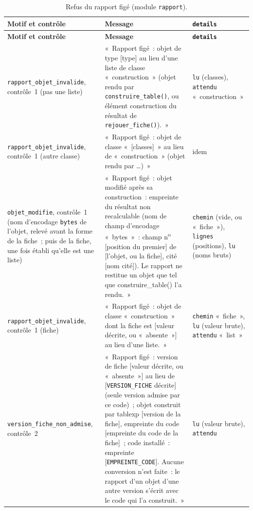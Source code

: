 \documentclass[a4paper,11pt]{article}
\newcommand{\code}[1]{\texttt{\small #1}}
\begin{document}
{\footnotesize
{}
\begin{longtable}{@{}p{4.7cm}p{7.3cm}p{2.6cm}@{}}
\caption{Refus du rapport figé (module \code{rapport}).}
\label{tab:refus-rapport}\\
\rowcolor{tableheader}
\textcolor{financeblue}{\textbf{Motif et contrôle}} &
\textcolor{financeblue}{\textbf{Message}} &
\textcolor{financeblue}{\textbf{\code{details}}} \\
\endfirsthead
\rowcolor{tableheader}
\textcolor{financeblue}{\textbf{Motif et contrôle}} &
\textcolor{financeblue}{\textbf{Message}} &
\textcolor{financeblue}{\textbf{\code{details}}} \\
\endhead
\code{rapport\_objet\_invalide}, contrôle~1 (pas une liste) & «~Rapport figé~: objet de type [type] au lieu d'une liste de classe «~construction~» (objet rendu par \code{construire\_table()}, ou élément construction du résultat de \code{rejouer\_fiche()}).~» & \code{lu} (classes), \code{attendu} «~construction~» \\
\code{rapport\_objet\_invalide}, contrôle~1 (autre classe) & «~Rapport figé~: objet de classe «~[classes]~» au lieu de «~construction~» (objet rendu par \ldots)~» & idem \\
\code{objet\_modifie}, contrôle~1 (nom d'encodage \code{bytes} de l'objet, relevé avant la forme de la fiche~; puis de la fiche, une fois établi qu'elle est une liste) & «~Rapport figé~: objet modifié après sa construction~: empreinte du résultat non recalculable (nom de champ d'encodage «~bytes~»~: champ n\textsuperscript{o} [position du premier] de [l'objet, ou la fiche], cité [nom cité]). Le rapport ne restitue un objet que tel que construire\_table() l'a rendu.~» & \code{chemin} (vide, ou «~fiche~»), \code{lignes} (positions), \code{lu} (noms bruts) \\
\code{rapport\_objet\_invalide}, contrôle~1 (fiche) & «~Rapport figé~: objet de classe «~construction~» dont la fiche est [valeur décrite, ou «~absente~»] au lieu d'une liste.~» & \code{chemin} «~fiche~», \code{lu} (valeur brute), \code{attendu} «~list~» \\
\code{version\_fiche\_non\_admise}, contrôle~2 & «~Rapport figé~: version de fiche [valeur décrite, ou «~absente~»] au lieu de [\code{VERSION\_FICHE} décrite] (seule version admise par ce code)~; objet construit par tablexp [version de la fiche], empreinte du code [empreinte du code de la fiche]~; code installé~: empreinte [\code{EMPREINTE\_CODE}]. Aucune conversion n'est faite~: le rapport d'un objet d'une autre version s'écrit avec le code qui l'a construit.~» & \code{lu} (valeur brute), \code{attendu} \\

\end{longtable}}
\end{document}
